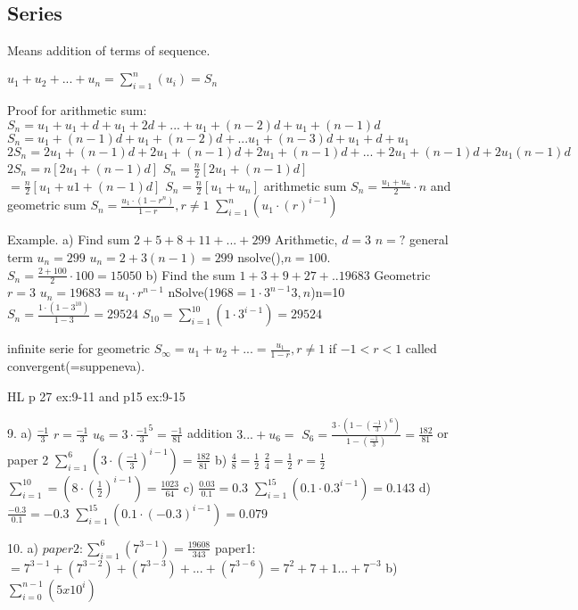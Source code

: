 \subsection{Series}

Means addition of terms of sequence.

$u_1+u_2+...+u_n=\sum_{i=1}^{n}(u_i)=S_n$

Proof for arithmetic sum:
$S_n=u_1+u_1+d+u_1+2d+...+u_1+(n-2)d+u_1+(n-1)d$
$S_n=u_1+(n-1)d+u_1+(n-2)d+...u_1+(n-3)d+u_1+d+u_1$
$2S_n=2u_1+(n-1)d+2u_1+(n-1)d+2u_1+(n-1)d+...+2u_1+(n-1)d+2u_1(n-1)d$
$2S_n=n[2u_1+(n-1)d]$
$S_n=\frac{n}{2}[2u_1+(n-1)d]$
$=\frac{n}{2}[u_1+u1+(n-1)d]$
$S_n=\frac{n}{2}[u_1+u_n]$
arithmetic sum $S_n=\frac{u_1+u_n}{2}\cdot n$
and geometric sum $S_n=\frac{u_1\cdot (1-r^n)}{1-r},r\neq1$
$\sum_{i=1}^{n}(u_1\cdot(r)^{i-1})$

Example.
a) Find sum $2+5+8+11+...+299$
Arithmetic, $d=3$
$n=?$ general term $u_n=299$
$u_n=2+3(n-1)=299$
nsolve(),$n=100$. 
$S_n=\frac{2+100}{2}\cdot 100=15050$
b) Find the sum $1+3+9+27+..19683$
Geometric $r=3$ $u_n=19683=u_1\cdot r^{n-1}$
nSolve($1968=1\cdot 3^{n-1}3,n$)n=10
$S_n=\frac{1\cdot(1-3^10)}{1-3}=29524$
$S_10=\sum_{i=1}^{10}(1\cdot 3^{i-1})=29524$

infinite serie for geometric $S_\infty=u_1+u_2+...=\frac{u_1}{1-r},r\neq 1$ if $-1<r<1$ called convergent(=suppeneva).

HL p 27 ex:9-11 and p15 ex:9-15

9. a) $\frac{-1}{3}$
$r=\frac{-1}{3}$
$u_6=3\cdot \frac{-1}{3}^{5}=\frac{-1}{81}$
addition $3...+u_6=$
$S_6=\frac{3\cdot(1-(\frac{-1}{3})^6)}{1-(\frac{-1}{3})}=\frac{182}{81}$
or paper 2 $\sum_{i=1}^{6}(3\cdot(\frac{-1}{3})^{i-1})=\frac{182}{81}$
b) $\frac{4}{8}=\frac{1}{2}$ $\frac{2}{4}=\frac{1}{2}$ 
$r=\frac{1}{2}$
$\sum_{i=1}^{10}=(8\cdot(\frac{1}{2})^{i-1})=\frac{1023}{64}$
c) $\frac{0.03}{0.1}=0.3$
$\sum_{i=1}^{15}(0.1\cdot0.3^{i-1})=0.143$
d) $\frac{-0.3}{0.1}=-0.3$
$\sum_{i=1}^{15}(0.1\cdot(-0.3)^{i-1})=0.079$

10. a) $paper2:\sum_{i=1}^{6}(7^{3-1})=\frac{19608}{343}$
paper1: $=7^{3-1}+(7^{3-2})+(7^{3-3})+...+(7^{3-6})=7^2+7+1...+7^{-3}$
b) $\sum_{i=0}^{n-1}(5x10^i)$
